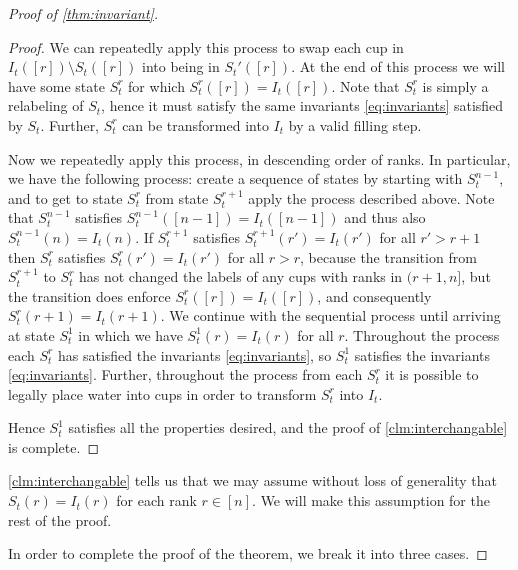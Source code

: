 \documentclass[twocolumn]{article}[10pt]
\begin{document}
\begin{proof}[Proof of \cref{thm:invariant}]
\begin{proof}
We can repeatedly apply this process to swap each cup in $I_t([r])\setminus
S_t([r])$ into being in $S_t'([r])$. At
the end of this process we will have some state $S_t^r$ for which
$S_t^r([r]) = I_t([r])$. Note that $S_t^r$ is simply a relabeling of $S_t$,
hence it must satisfy the same invariants \eqref{eq:invariants} satisfied by
$S_t$. Further, $S_t^r$ can be transformed into $I_t$ by a valid filling step.

Now we repeatedly apply this process, in descending order of ranks. 
In particular, we have the following process: create a sequence of states by
starting with $S_t^{n-1}$, and to get to state $S_t^{r}$ from state $S_t^{r+1}$
apply the process described above. 
Note that $S_t^{n-1}$ satisfies $S_t^{n-1}([n-1]) = I_t([n-1])$ and thus also
$S_t^{n-1}(n) = I_t(n)$.
If $S_t^{r+1}$ satisfies $S_t^{r+1}(r') = I_t(r')$ for all $r'>r+1$ then
$S_t^r$ satisfies $S_t^r(r') = I_t(r')$ for all $r > r$, because the transition
from $S_t^{r+1}$ to $S_t^r$ has not changed the labels of any cups with ranks
in $(r+1, n]$, but the transition does enforce $S_t^r([r]) = I_t([r])$, and
consequently $S_t^r(r+1) = I_t(r+1)$.
We continue with the sequential process until arriving at state $S_t^1$ in
which we have $S_t^1(r) = I_t(r)$ for all $r$.
Throughout the process each $S_t^r$ has satisfied the invariants
\eqref{eq:invariants}, so $S_t^1$ satisfies the invariants
\eqref{eq:invariants}. Further, throughout the process from each $S_t^r$ it is
possible to legally place water into cups in order to transform $S_t^r$ into
$I_t$.

Hence $S_t^1$ satisfies all the properties desired, and the proof of 
\cref{clm:interchangable} is complete.

\end{proof}

\cref{clm:interchangable} tells us that we may assume without loss of
generality that $S_t(r) = I_t(r)$ for each rank $r \in [n]$. We will make
this assumption for the rest of the proof. 

In order to complete the proof of the theorem, we break it into three cases. 


\end{proof}
\end{document}
